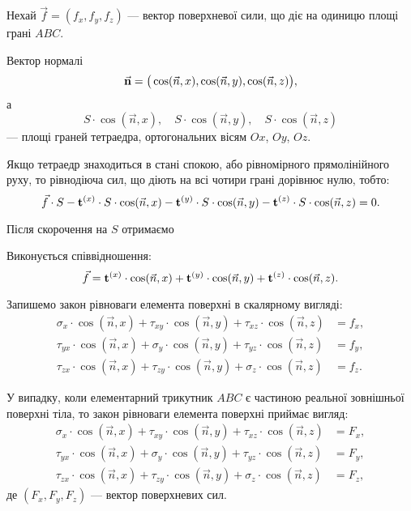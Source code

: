 Нехай $\vec f = (f_x, f_y, f_z)$ --- вектор поверхневої сили, що діє на одиницю площі грані $ABC$. \medskip

Вектор нормалі
\begin{equation}
	\vec{\bf{n}} = \big( \cos( \vec n, x ), \cos ( \vec n, y ), \cos ( \vec n, z ) \big),
\end{equation}
а
\begin{equation}
	S \cdot \cos (\vec n, x ), \quad S \cdot \cos (\vec n, y ), \quad S \cdot \cos (\vec n, z) 	
\end{equation} 
--- площі граней тетраедра, ортогональних вісям $Ox$, $Oy$, $Oz$. \medskip

Якщо тетраедр знаходиться в стані спокою, або рівномірного прямолінійного руху, то рівнодіюча сил, що діють на всі чотири грані дорівнює нулю, тобто: 
\begin{equation}
	\vec f \cdot S - \bf{t}^{(x)} \cdot S \cdot \cos ( \vec n, x) - \bf{t}^{(y)} \cdot S \cdot \cos ( \vec n, y) - \bf{t}^{(z)} \cdot S \cdot \cos ( \vec n, z) = 0.
\end{equation}

Після скорочення на $S$ отримаємо
\begin{law*}
	Виконується співвідношення:
	\begin{equation}
		\vec f = \bf{t}^{(x)} \cdot \cos ( \vec n, x) + \bf{t}^{(y)} \cdot \cos ( \vec n, y) + \bf{t}^{(z)} \cdot \cos ( \vec n, z).
	\end{equation}
\end{law*}

Запишемо закон рівноваги елемента поверхні в скалярному вигляді:
\begin{align}
	\sigma_x \cdot \cos ( \vec n, x ) + \tau_{xy} \cdot \cos ( \vec n, y ) + \tau_{xz} \cdot \cos ( \vec n, z ) &= f_x, \\
	\tau_{yx} \cdot \cos ( \vec n, x ) + \sigma_y \cdot \cos ( \vec n, y ) + \tau_{yz} \cdot \cos ( \vec n, z ) &= f_y, \\
	\tau_{zx} \cdot \cos ( \vec n, x ) + \tau_{zy} \cdot \cos ( \vec n, y ) + \sigma_z \cdot \cos ( \vec n, z ) &= f_z.
\end{align}

У випадку, коли елементарний трикутник $ABC$ є частиною реальної зовнішньої поверхні тіла, то закон рівноваги елемента поверхні приймає вигляд:
\begin{align}
	\sigma_x \cdot \cos ( \vec n, x ) + \tau_{xy} \cdot \cos ( \vec n, y ) + \tau_{xz} \cdot \cos ( \vec n, z ) &= F_x, \\
	\tau_{yx} \cdot \cos ( \vec n, x ) + \sigma_y \cdot \cos ( \vec n, y ) + \tau_{yz} \cdot \cos ( \vec n, z ) &= F_y, \\
	\tau_{zx} \cdot \cos ( \vec n, x ) + \tau_{zy} \cdot \cos ( \vec n, y ) + \sigma_z \cdot \cos ( \vec n, z ) &= F_z,
\end{align}
де $(F_x, F_y, F_z)$ --- вектор поверхневих сил. \medskip


